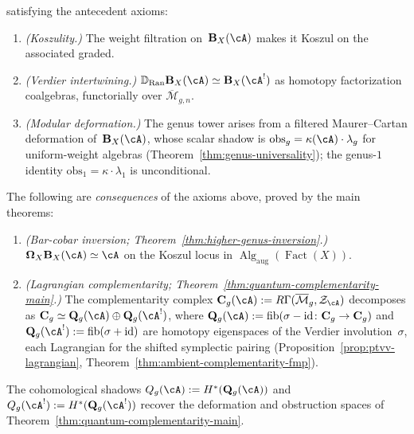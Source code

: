 \begin{definition}
\noindent satisfying the antecedent axioms:
\begin{enumerate}[label=\textup{(MK\arabic*$_\infty$)}]
\item\label{MK:koszul-htpy}
\emph{(Koszulity.)}
The weight filtration on~$\mathbf{B}_X(\cA)$ makes it Koszul on
the associated graded.

\item\label{MK:verdier-htpy}
\emph{(Verdier intertwining.)}
$\mathbb{D}_{\operatorname{Ran}} \mathbf{B}_X(\cA) \simeq
\mathbf{B}_X(\cA^!)$
as homotopy factorization coalgebras, functorially over
$\overline{\mathcal{M}}_{g,n}$.

\item\label{MK:modular-htpy}
\emph{(Modular deformation.)}
The genus tower arises from a filtered Maurer--Cartan deformation
of~$\mathbf{B}_X(\cA)$, whose scalar shadow is
$\mathrm{obs}_g = \kappa(\cA) \cdot \lambda_g$ for
uniform-weight algebras
\textup{(}Theorem~\textup{\ref{thm:genus-universality})}; the
genus-$1$ identity $\mathrm{obs}_1 = \kappa \cdot \lambda_1$ is
unconditional.
\end{enumerate}

\noindent The following are \emph{consequences} of the axioms above,
proved by the main theorems:
\begin{enumerate}[label=\textup{(MK\arabic*$_\infty$)},start=4]
\item\label{MK:inversion-htpy}
\emph{(Bar-cobar inversion; Theorem~\textup{\ref{thm:higher-genus-inversion}}.)}
$\boldsymbol{\Omega}_X \mathbf{B}_X(\cA) \simeq \cA$
on the Koszul locus in
$\operatorname{Alg}_{\mathrm{aug}}(\operatorname{Fact}(X))$.

\item\label{MK:complementarity-htpy}
\emph{(Lagrangian complementarity; Theorem~\textup{\ref{thm:quantum-complementarity-main}}.)}
The complementarity complex
$\mathbf{C}_g(\cA) := R\Gamma(\overline{\mathcal{M}}_g, \mathcal{Z}_{\cA})$
decomposes as
$\mathbf{C}_g \simeq \mathbf{Q}_g(\cA) \oplus \mathbf{Q}_g(\cA^!)$,
where $\mathbf{Q}_g(\cA) := \operatorname{fib}(\sigma - \mathrm{id}
\colon \mathbf{C}_g \to \mathbf{C}_g)$ and
$\mathbf{Q}_g(\cA^!) := \operatorname{fib}(\sigma + \mathrm{id})$
are homotopy eigenspaces of the Verdier involution~$\sigma$, each
Lagrangian for the shifted symplectic pairing
\textup{(}Proposition~\textup{\ref{prop:ptvv-lagrangian}},
Theorem~\textup{\ref{thm:ambient-complementarity-fmp})}.
\end{enumerate}
The cohomological shadows
$Q_g(\cA) := H^*(\mathbf{Q}_g(\cA))$ and
$Q_g(\cA^!) := H^*(\mathbf{Q}_g(\cA^!))$ recover the
deformation and obstruction spaces of
Theorem~\ref{thm:quantum-complementarity-main}.
\end{definition}

